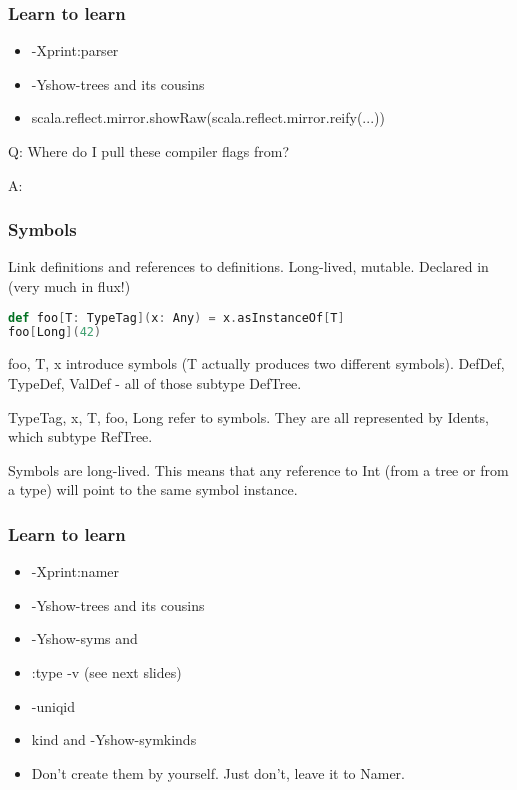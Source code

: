 \documentclass[hyperref={bookmarks=false}]{beamer}
\begin{document}
\begin{frame}[fragile]
\frametitle{Learn to learn}

\begin{itemize}
\item -Xprint:parser
\item -Yshow-trees and its cousins
\item scala.reflect.mirror.showRaw(scala.reflect.mirror.reify(...))
\end{itemize}

Q: Where do I pull these compiler flags from?

A: 

\end{frame}

\begin{frame}[fragile]
\frametitle{Symbols}

Link definitions and references to definitions.
Long-lived, mutable.
Declared in  (very much in flux!)

\begin{lstlisting}[language=Scala]
def foo[T: TypeTag](x: Any) = x.asInstanceOf[T]
foo[Long](42)
\end{lstlisting}

foo, T, x introduce symbols (T actually produces two different symbols).
DefDef, TypeDef, ValDef - all of those subtype DefTree.

TypeTag, x, T, foo, Long refer to symbols.
They are all represented by Idents, which subtype RefTree.

Symbols are long-lived. This means that any
reference to Int (from a tree or from a type) will point to the
same symbol instance.

\end{frame}

\begin{frame}[fragile]
\frametitle{Learn to learn}

\begin{itemize}
\item -Xprint:namer
\item -Yshow-trees and its cousins
\item -Yshow-syms and 
\item :type -v (see next slides)
\item -uniqid
\item kind and -Yshow-symkinds
\item Don't create them by yourself. Just don't, leave it to Namer.
\end{itemize}

\end{frame}
\end{document}
